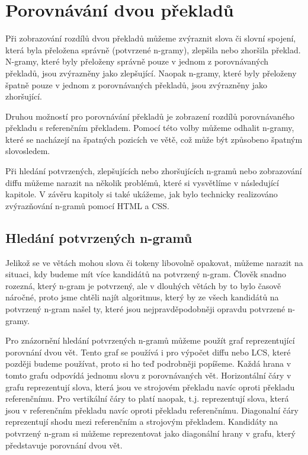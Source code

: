 \chapter{Porovnávání dvou překladů}
Při zobrazování rozdílů dvou překladů můžeme zvýraznit slova či slovní spojení,
  která byla přeložena správně (potvrzené n-gramy),
  zlepšila nebo zhoršila překlad.
N-gramy, které byly přeloženy správně pouze v jednom z porovnávaných překladů,
  jsou zvýrazněny jako zlepšující.
Naopak n-gramy, které byly přeloženy špatně pouze v jednom z porovnávaných překladů,
  jsou zvýrazněny jako zhoršující. 

Druhou možností pro porovnávání překladů je zobrazení rozdílů porovnávaného překladu s referenčním překladem.
Pomocí této volby můžeme odhalit n-gramy,
  které se nacházejí na špatných pozicích ve větě,
  což může být způsobeno špatným slovosledem.

Při hledání potvrzených, zlepšujících nebo zhoršujících n-gramů nebo zobrazování diffu můžeme narazit na několik problémů,
  které si vysvětlíme v následující kapitole.
V závěru kapitoly si také ukážeme,
  jak bylo technicky realizováno zvýrazňování n-gramů pomocí HTML a CSS.

\section{Hledání potvrzených n-gramů}
Jelikož se ve větách mohou slova či tokeny libovolně opakovat,
  můžeme narazit na situaci,
  kdy budeme mít více kandidátů na potvrzený n-gram.
Člověk snadno rozezná,
  který n-gram je potvrzený,
  ale v dlouhých větách by to bylo časově náročné,
  proto jsme chtěli najít algoritmus,
  který by ze všech kandidátů na potvrzený n-gram našel ty,
  které jsou nejpravděpodobněji opravdu potvrzené n-gramy.

Pro znázornění hledání potvrzených n-gramů můžeme použít graf reprezentující porovnání dvou vět.
Tento graf se používá i pro výpočet diffu nebo LCS,
  které později budeme používat,
  proto si ho teď podrobněji popíšeme.
Každá hrana v tomto grafu odpovídá jednomu slovu z porovnávaných vět.
Horizontální čáry v grafu reprezentují slova, která jsou ve strojovém překladu navíc oproti překladu referenčnímu. 
Pro vertikální čáry to platí naopak, t.j. reprezentují slova, která jsou v referenčním překladu navíc oproti překladu referenčnímu.
Diagonalní čáry reprezentují shodu mezi referenčním a strojovým překladem.
Kandidáty na potvrzený n-gram si můžeme reprezentovat jako diagonální hrany v grafu,
  který představuje porovnání dvou vět.

